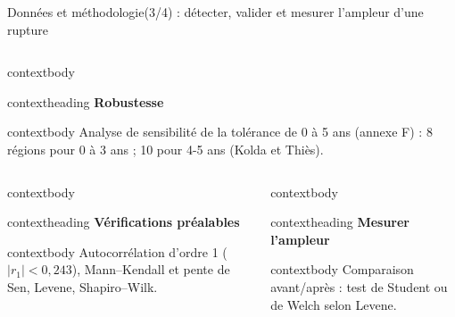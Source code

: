 \documentclass[aspectratio=169,11pt]{beamer}
\begin{document}
\begin{frame}{Données et méthodologie(3/4) : détecter, valider et mesurer l’ampleur d’une rupture}
\begin{columns}[T,onlytextwidth]
\begin{beamercolorbox}[wd=\linewidth,rounded=true,sep=0pt]{contextbody}
\begin{beamercolorbox}[wd=\linewidth,ht=0.42cm,dp=0.08cm,leftskip=0.16cm]{contextheading}
          \bfseries Robustesse
        \end{beamercolorbox}
        \begin{beamercolorbox}[wd=\linewidth,sep=0.10cm]{contextbody}
          \small
          Analyse de sensibilité de la tolérance de 0 à 5 ans (annexe F) : \textcolor{marine}{8 régions} pour 0 à 3 ans ; 10 pour 4-5 ans (Kolda et Thiès).
        \end{beamercolorbox}
      \end{beamercolorbox}
  \end{columns}
  \vspace{0.14cm}
  \begin{columns}[T,onlytextwidth]
      \begin{beamercolorbox}[wd=\linewidth,rounded=true,sep=0pt]{contextbody}
        \begin{beamercolorbox}[wd=\linewidth,ht=0.42cm,dp=0.08cm,leftskip=0.16cm]{contextheading}
          \bfseries Vérifications préalables
        \end{beamercolorbox}
        \begin{beamercolorbox}[wd=\linewidth,sep=0.10cm]{contextbody}
          \footnotesize
          Autocorrélation d’ordre 1 ($|r_1|<0{,}243$), Mann--Kendall et pente de Sen, Levene, Shapiro--Wilk.
        \end{beamercolorbox}
      \end{beamercolorbox}
      \begin{beamercolorbox}[wd=\linewidth,rounded=true,sep=0pt]{contextbody}
        \begin{beamercolorbox}[wd=\linewidth,ht=0.42cm,dp=0.08cm,leftskip=0.16cm]{contextheading}
          \bfseries Mesurer l'ampleur
        \end{beamercolorbox}
        \begin{beamercolorbox}[wd=\linewidth,sep=0.10cm]{contextbody}
          \footnotesize
          Comparaison avant/après : test de Student ou de Welch selon Levene.
        \end{beamercolorbox}
      \end{beamercolorbox}
  \end{columns}
\end{frame}
\end{document}
